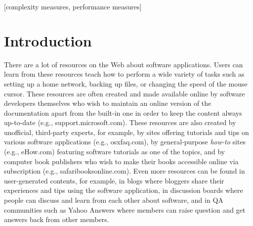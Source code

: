 \documentclass{www2010-submission}
\begin{document}
\begin{abstract}
This paper provides a sample of a LaTeX document which conforms,
somewhat loosely, to the formatting guidelines for
ACM SIG Proceedings. It is an {\em alternate} style which produces
a {\em tighter-looking} paper and was designed in response to
concerns expressed, by authors, over page-budgets.
It complements the document \textit{Author's (Alternate) Guide to
Preparing ACM SIG Proceedings Using \LaTeX$2_\epsilon$\ and Bib\TeX}.
This source file has been written with the intention of being
compiled under \LaTeX$2_\epsilon$\ and BibTeX.
The developers have tried to include every imaginable sort
of ``bells and whistles", such as a subtitle, footnotes on
title, subtitle and authors, as well as in the text, and
every optional component (e.g. Acknowledgments, Additional
Authors, Appendices), not to mention examples of
equations, theorems, tables and figures.
To make best use of this sample document, run it through \LaTeX\
and BibTeX, and compare this source code with the printed
output produced by the dvi file. A compiled PDF version
is available on the web page to help you with the
`look and feel'.
\end{abstract}

[complexity measures,
performance measures]



\section{Introduction}

There are a lot of resources on the Web about software
applications. Users can learn from these resources teach how to
perform a wide variety of tasks such as setting up a home network,
backing up files, or changing the speed of the mouse cursor. These
resources are often created and made available online by software
developers themselves who wish to maintain an online version of
the documentation apart from the built-in one in order to keep the
content always up-to-date (e.g., support.microsoft.com). These
resources are also created by unofficial, third-party experts, for
example, by sites offering tutorials and tips on various software
applications (e.g., osxfaq.com), by general-purpose \emph{how-to}
sites (e.g., eHow.com) featuring software tutorials as one of the
topics, and by computer book publishers who wish to make their
books accessible online via subscription (e.g.,
safaribooksonline.com). Even more resources can be found in
user-generated contents, for example, in blogs where bloggers
share their experiences and tips using the software application,
in discussion boards where people can discuss and learn from each
other about software, and in QA communities such as Yahoo Answers
where members can raise question and get answers back from other
members.
\end{document}
